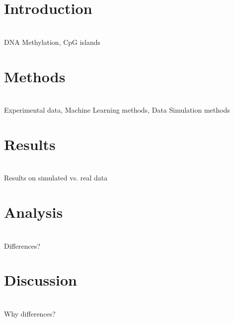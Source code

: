 \section{Introduction}
\\
DNA Methylation, CpG islands
\\
\section{Methods}
\\
Experimental data, Machine Learning methods, Data Simulation methods
\\
\section{Results}
\\
Results on simulated vs. real data
\\
\section{Analysis}
\\
Differences?
\\
\section{Discussion}
\\
Why differences?




    
    
    
    
    
    
    
    
    